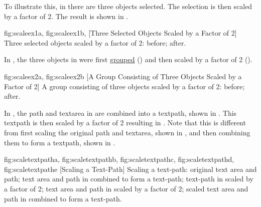 To illustrate this, in  there are three
\glspl*{object} selected.
The selection is then scaled by a factor of 2.
The result is shown in .

{
 {fig:scaleex1a}{}{},
 {fig:scaleex1b}{}{},
}
[Three Selected Objects Scaled by a Factor of 2]
{Three selected objects scaled by a factor of 2:
 before;
 after.}

In , the three objects in
 were first
\hyperref[sec:grouping]{grouped} ()
and then scaled by a factor of 2 ().

{
 {fig:scaleex2a}{}{},
 {fig:scaleex2b}{}{}
}
[A Group Consisting of Three Objects Scaled by a Factor of 2]
{A group consisting of three objects scaled by a factor of 2:
 before;
 after.}

In , the \gls*{path} and
\gls*{textarea} in  are combined
into a \gls*{textpath}, shown in
. This \gls*{textpath} is then
scaled by a factor of 2 resulting in
. Note that this is different
from first scaling the original \gls*{path} and \gls*{textarea},
shown in , and then combining
them to form a \gls*{textpath}, shown in
.

{
 {fig:scaletextpatha}{}{},
 {fig:scaletextpathb}{}{},
 {fig:scaletextpathc}{}{},
 {fig:scaletextpathd}{}{},
 {fig:scaletextpathe}{}{}
}
[Scaling a Text-Path]
{Scaling a text-path:
 original text area and path;
 text area and path in
 combined to form a text-path;
 text-path 
in  scaled by a factor of 2;
 text area and path 
in  scaled by a factor of 2;
 scaled text area and path 
in  combined to form a text-path.}

